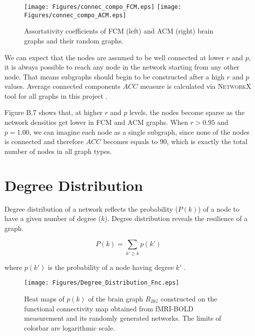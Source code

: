 \begin{figure}[htbp]
 
  \centering
	 \texttt{[image: Figures/connec\_compo\_FCM.eps]}
	 \texttt{[image: Figures/connec\_compo\_ACM.eps]}
  \caption[Average Connected Components]{Assortativity coefficients of FCM (left) and ACM (right) brain graphs and their random graphs.} 
    \label{fig:Average Connected Components}
 	
\end{figure}

We can expect that the nodes are assumed to be well connected at lower $r$ and $p$, it is always possible to reach any node in the network starting from any other node. That means subgraphs should begin to be constructed after a high $r$ and $p$ values. Average connected components $ACC$ measure is calculated via \textsc{NetworkX} tool for all graphs in this project \citep{XYZNETW}.

Figure B.7 shows that, at higher $r$ and $p$ levels, the nodes become sparse as the network densities get lower in FCM and ACM graphs. When $r>0.95$ and $p=1.00$, we can imagine each node as a single subgraph, since none of the nodes is connected and therefore $ACC$ becomes equals to 90, which is exactly the total number of nodes in all graph types. 


\section{Degree Distribution}
Degree distribution of a network reflects the probability ($P(k)$) of a node to have a given number of degree ($k$). Degree distribution reveals the resilience of a graph. 

\begin{equation}
 P(k) = \sum\limits_{k' \geq k} p(k')
\end{equation}

where $p(k')$ is the probability of a node having degree $k'$ \citep{BAR99a}. 


\begin{figure}[htbp]
 
  \centering
	 \texttt{[image: Figures/Degree\_Distribution\_Fnc.eps]}
  \caption[Degree Distribution, FCM]{Heat maps of $p(k)$ of the brain graph $R_{BG}$ constructed on the functional connectivity map obtained from fMRI-BOLD measurement and its randomly generated networks. The limits of colorbar are logarithmic scale.} 
    \label{fig:Degree Distribution, FCM}
 	
\end{figure}



